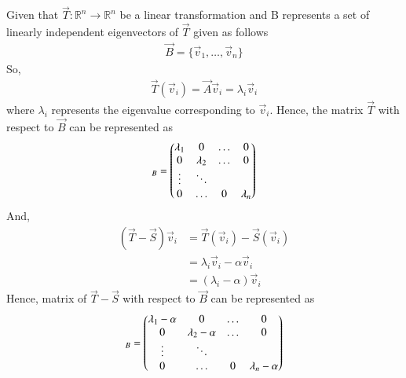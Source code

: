 Given that $\vec{T}: \mathbb R^n \rightarrow \mathbb R^n$ be a linear transformation and B represents a set of linearly independent eigenvectors of $\vec{T}$ given as follows
\begin{align}
    \vec{B} = \{\vec{v}_1,\ldots,\vec{v}_n\}
\end{align}
So,
\begin{align}
    \vec{T}(\vec{v}_i) = \vec{A}\vec{v}_i = \lambda_i\vec{v}_i
\end{align}
where $\lambda_i$ represents the eigenvalue corresponding to $\vec{v}_i$. Hence, the matrix $\vec{T}$ with respect to $\vec{B}$ can be represented as
\begin{align}
    [\vec{T}]_B = \myvec{\lambda_1 & 0 & \dots & 0\\ 0 & \lambda_2 & \dots & 0\\ \vdots & \ddots &  & \\ 0 & \dots & 0 & \lambda_n}\label{eq:solutions/2015/june/72/eq:T}
\end{align}
And,
\begin{align}
    (\vec{T}-\vec{S})\vec{v}_i & = \vec{T}(\vec{v}_i) - \vec{S}(\vec{v}_i)\\& = \lambda_i\vec{v}_i - \alpha\vec{v}_i \\ & = (\lambda_i - \alpha)\vec{v}_i
\end{align}
Hence, matrix of $\vec{T}-\vec{S}$ with respect to $\vec{B}$ can be represented as
\begin{align}
    [\vec{T}-\vec{S}]_B = \myvec{\lambda_1-\alpha & 0 & \dots & 0\\ 0 & \lambda_2-\alpha & \dots & 0\\ \vdots & \ddots &  & \\ 0 & \dots & 0 & \lambda_n-\alpha}\label{eq:solutions/2015/june/72/eq:T-S}
\end{align}
\onecolumn
